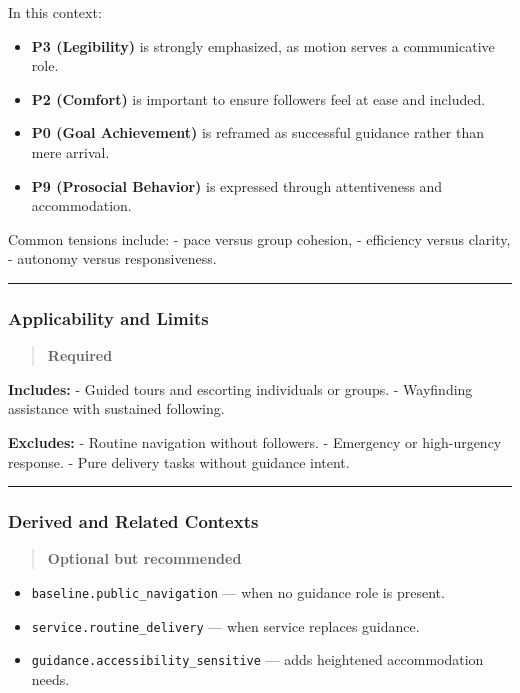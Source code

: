\documentclass[utf8]{frontiers_suppmat} %
\providecommand{\tightlist}{%
  \setlength{\itemsep}{0pt}\setlength{\parskip}{0pt}}
\begin{document}
In this context:

\begin{itemize}
\tightlist
\item
  \textbf{P3 (Legibility)} is strongly emphasized, as motion serves a
  communicative role.
\item
  \textbf{P2 (Comfort)} is important to ensure followers feel at ease
  and included.
\item
  \textbf{P0 (Goal Achievement)} is reframed as successful guidance
  rather than mere arrival.
\item
  \textbf{P9 (Prosocial Behavior)} is expressed through attentiveness
  and accommodation.
\end{itemize}

Common tensions include: - pace versus group cohesion, - efficiency
versus clarity, - autonomy versus responsiveness.

\begin{center}\rule{0.5\linewidth}{0.5pt}\end{center}

\subsubsection{Applicability and Limits}\label{applicability-and-limits}

\begin{quote}
\textbf{Required}
\end{quote}

\textbf{Includes:} - Guided tours and escorting individuals or groups. -
Wayfinding assistance with sustained following.

\textbf{Excludes:} - Routine navigation without followers. - Emergency
or high-urgency response. - Pure delivery tasks without guidance intent.

\begin{center}\rule{0.5\linewidth}{0.5pt}\end{center}

\subsubsection{Derived and Related
Contexts}\label{derived-and-related-contexts}

\begin{quote}
\textbf{Optional but recommended}
\end{quote}

\begin{itemize}
\tightlist
\item
  \texttt{baseline.public\_navigation} --- when no guidance role is
  present.
\item
  \texttt{service.routine\_delivery} --- when service replaces guidance.
\item
  \texttt{guidance.accessibility\_sensitive} --- adds heightened
  accommodation needs.
\end{itemize}
\end{document}
